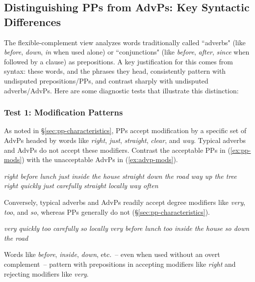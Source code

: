 \subsection{Distinguishing PPs from AdvPs: Key Syntactic Differences}\label{sec:distinguishing-pps-advps}

The flexible-complement view analyzes words traditionally called ``adverbs" (like \textit{before}, \textit{down}, \textit{in} when used alone) or ``conjunctions" (like \textit{before}, \textit{after}, \textit{since} when followed by a clause) as prepositions. A key justification for this comes from syntax: these words, and the phrases they head, consistently pattern with undisputed prepositions/PPs, and contrast sharply with undisputed adverbs/AdvPs. Here are some diagnostic tests that illustrate this distinction:

\subsubsection*{Test 1: Modification Patterns}\label{sec:test-modification}

As noted in \S\ref{sec:pp-characteristics}, PPs accept modification by a specific set of AdvPs headed by words like \textit{right}, \textit{just}, \textit{straight}, \textit{clear}, and \textit{way}. Typical adverbs and AdvPs do not accept these modifiers. Contrast the acceptable PPs in (\ref{ex:pp-mods}) with the unacceptable AdvPs in (\ref{ex:advp-mods}).

\ea\label{ex:pp-mods} %
    \ea \textit{right before lunch}
    \ex \textit{just inside the house}
    \ex \textit{straight down the road}
    \ex \textit{way up the tree}
    \z
\z
\ea\label{ex:advp-mods} %
    \ea *\textit{right quickly}
    \ex *\textit{just carefully}
    \ex *\textit{straight locally}
    \ex *\textit{way often}
\z
\z

Conversely, typical adverbs and AdvPs readily accept degree modifiers like \textit{very}, \textit{too}, and \textit{so}, whereas PPs generally do not (\S\ref{sec:pp-characteristics}).

\ea\label{ex:advp-mods2} 
    \ea \textit{very quickly}
    \ex \textit{too carefully}
    \ex \textit{so locally}
    \z
\z
\ea\label{ex:pp-mods2} %
    \ea *\textit{very before lunch}
    \ex *\textit{too inside the house}
    \ex *\textit{so down the road}
    \z
\z

Words like \textit{before}, \textit{inside}, \textit{down}, etc.~-- even when used without an overt complement~-- pattern with prepositions in accepting modifiers like \textit{right} and rejecting modifiers like \textit{very}.

